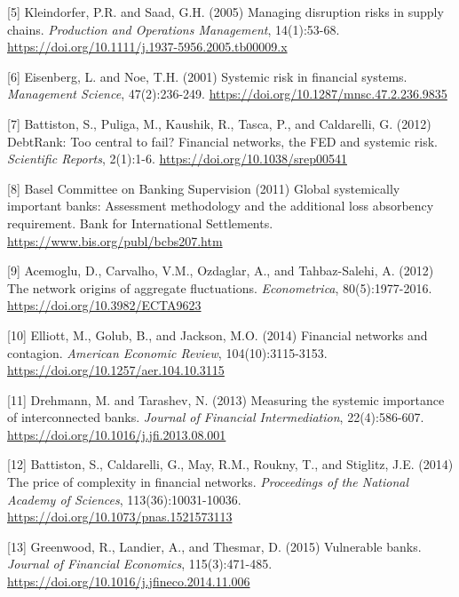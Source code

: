 \documentclass[a4 paper, 11pt,twoside]{article}
\newcommand{\0}{\Bf{0}}
\theoremstyle{definition}
\begin{document}
\label{ref5}[5] Kleindorfer, P.R. and Saad, G.H. (2005) Managing disruption risks in supply chains. \emph{Production and Operations Management}, 14(1):53-68. \href{https://doi.org/10.1111/j.1937-5956.2005.tb00009.x}{https://doi.org/10.1111/j.1937-5956.2005.tb00009.x}

\label{ref6}[6] Eisenberg, L. and Noe, T.H. (2001) Systemic risk in financial systems. \emph{Management Science}, 47(2):236-249. \href{https://doi.org/10.1287/mnsc.47.2.236.9835}{https://doi.org/10.1287/mnsc.47.2.236.9835}

\label{ref7}[7] Battiston, S., Puliga, M., Kaushik, R., Tasca, P., and Caldarelli, G. (2012) DebtRank: Too central to fail? Financial networks, the FED and systemic risk. \emph{Scientific Reports}, 2(1):1-6. \href{https://doi.org/10.1038/srep00541}{https://doi.org/10.1038/srep00541}

\label{ref8}[8] Basel Committee on Banking Supervision (2011) Global systemically important banks: Assessment methodology and the additional loss absorbency requirement. Bank for International Settlements. \href{https://www.bis.org/publ/bcbs207.htm}{https://www.bis.org/publ/bcbs207.htm}

\label{ref9}[9] Acemoglu, D., Carvalho, V.M., Ozdaglar, A., and Tahbaz-Salehi, A. (2012) The network origins of aggregate fluctuations. \emph{Econometrica}, 80(5):1977-2016. \href{https://doi.org/10.3982/ECTA9623}{https://doi.org/10.3982/ECTA9623}

\label{ref10}[10] Elliott, M., Golub, B., and Jackson, M.O. (2014) Financial networks and contagion. \emph{American Economic Review}, 104(10):3115-3153. \href{https://doi.org/10.1257/aer.104.10.3115}{https://doi.org/10.1257/aer.104.10.3115}

\label{ref11}[11] Drehmann, M. and Tarashev, N. (2013) Measuring the systemic importance of interconnected banks. \emph{Journal of Financial Intermediation}, 22(4):586-607. \href{https://doi.org/10.1016/j.jfi.2013.08.001}{https://doi.org/10.1016/j.jfi.2013.08.001}

\label{ref12}[12] Battiston, S., Caldarelli, G., May, R.M., Roukny, T., and Stiglitz, J.E. (2014) The price of complexity in financial networks. \emph{Proceedings of the National Academy of Sciences}, 113(36):10031-10036. \href{https://doi.org/10.1073/pnas.1521573113}{https://doi.org/10.1073/pnas.1521573113}

\label{ref13}[13] Greenwood, R., Landier, A., and Thesmar, D. (2015) Vulnerable banks. \emph{Journal of Financial Economics}, 115(3):471-485. \href{https://doi.org/10.1016/j.jfineco.2014.11.006}{https://doi.org/10.1016/j.jfineco.2014.11.006}
\end{document}
